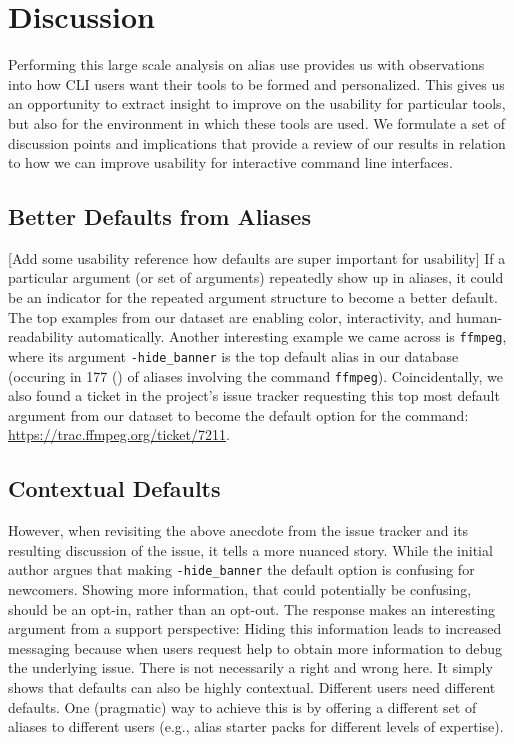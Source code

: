 \section{Discussion}

Performing this large scale analysis on alias use provides us with observations into how CLI users want their tools to be formed and personalized.
This gives us an opportunity to extract insight to improve on the usability for particular tools, but also for the environment in which these tools are used.
We formulate a set of discussion points and implications that provide a review of our results in relation to how we can improve usability for interactive command line interfaces.

\subsection{Better Defaults from Aliases}

[\TODO Add some usability reference how defaults are super important for usability]
If a particular argument (or set of arguments) repeatedly show up in aliases, it could be an indicator for the repeated argument structure to become a better default. 
The top examples from our dataset are enabling color, interactivity, and human-readability automatically.
Another interesting example we came across is \verb|ffmpeg|, where its argument \verb|-hide_banner| is the top default alias in our database (occuring in \num{177} () of aliases involving the command \verb|ffmpeg|).
Coincidentally, we also found a ticket in the project's issue tracker requesting this top most default argument from our dataset to become the default option for the command: \url{https://trac.ffmpeg.org/ticket/7211}.


\subsection{Contextual Defaults}

However, when revisiting the above anecdote from the issue tracker and its resulting discussion of the issue, it tells a more nuanced story.
While the initial author argues that making \verb|-hide_banner| the default option is confusing for newcomers.
Showing more information, that could potentially be confusing, should be an opt-in, rather than an opt-out.
The response makes an interesting argument from a support perspective: Hiding this information leads to increased messaging because when users request help to obtain more information to debug the underlying issue.
There is not necessarily a right and wrong here.
It simply shows that defaults can also be highly contextual.
Different users need different defaults.
One (pragmatic) way to achieve this is by offering a different set of aliases to different users (e.g., alias starter packs for different levels of expertise).

